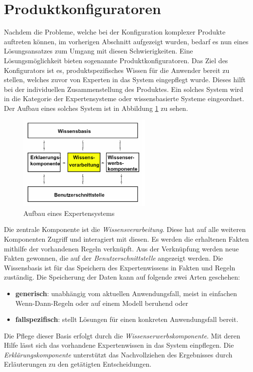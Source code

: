 \section{Produktkonfiguratoren}\label{konfiguratoren}
Nachdem die Probleme, welche bei der Konfiguration komplexer Produkte auftreten können, im vorherigen Abschnitt aufgezeigt wurden, bedarf es nun eines Lösungsansatzes zum Umgang mit diesen Schwierigkeiten.
Eine Lösungsmöglichkeit bieten sogenannte Produktkonfiguratoren.
Das Ziel des Konfigurators ist es, produktspezifisches Wissen für die Anwender bereit zu stellen, welches zuvor von Experten in das System eingepflegt wurde. Dieses hilft bei der individuellen Zusammenstellung des Produktes. Ein solches System wird in die Kategorie der Expertensysteme\cite{bib:puppe} oder wissensbasierte Systeme eingeordnet. Der Aufbau eines solches System ist in Abbildung \ref{expert_system_structure} zu sehen. \par
\begin{figure}[H]
\centering
\includegraphics[width=250px]{images/expertensysteme}
\caption{Aufbau eines Expertensystems \cite[s.6]{bib:keller}}
\label{expert_system_structure}
\end{figure}

Die zentrale Komponente ist die \textit{Wissensverarbeitung}. Diese hat auf alle weiteren Komponenten Zugriff und interagiert mit diesen. Es werden die erhaltenen Fakten mithilfe der vorhandenen Regeln verknüpft. Aus der Verknüpfung werden neue Fakten gewonnen, die auf der \textit{Benutzerschnittstelle} angezeigt werden. Die Wissensbasis ist für das Speichern des Expertenwissens in Fakten und Regeln zuständig. Die Speicherung der Daten kann auf folgende zwei Arten geschehen\cite{bib:expert1}:\par
\begin{itemize}
        \item \textbf{generisch}: unabhängig vom aktuellen Anwendungsfall, meist in einfachen Wenn-Dann-Regeln oder auf einem Modell beruhend oder 
        \item \textbf{fallspezifisch}: stellt Lösungen für einen konkreten Anwendungsfall bereit.
\end{itemize}
 Die Pflege dieser Basis erfolgt durch die \textit{Wissenserwerbskomponente}. Mit deren Hilfe lässt sich das vorhandene Expertenwissen in das System einpflegen. Die \textit{Erklärungskomponente} unterstützt das Nachvollziehen des Ergebnisses durch Erläuterungen zu den getätigten Entscheidungen.

